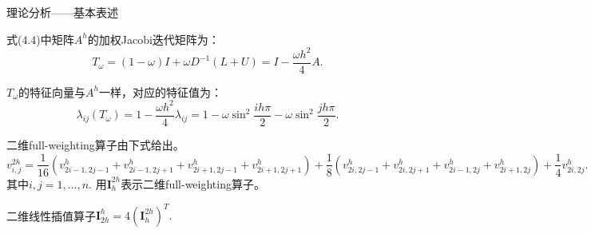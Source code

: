 \documentclass[9pt]{beamer}
\begin{document}
\begin{frame}{理论分析——基本表述}
  \small
\begin{lemma}
  \small
  式(4.4)中矩阵$A^h$的加权Jacobi迭代矩阵为：
  \begin{equation}
    T_\omega=(1-\omega)I+\omega D^{-1}(L+U)=I-\frac{\omega h^2}{4}A.
  \end{equation}

  $T_\omega$的特征向量与$A^h$一样，对应的特征值为：
  \begin{equation}
    \lambda_{ij}(T_\omega)=1-\frac{\omega h^2}{4}\lambda_{ij}=1-\omega\sin^2\frac{ih\pi}{2}-\omega\sin^2\frac{jh\pi}{2}.
  \end{equation}
\end{lemma}

\pause
\begin{definition}
  \small
  二维full-weighting算子由下式给出。
  {\tiny\hspace{-1em}
  \begin{equation*}
  v^{2h}_{i,j}=\frac{1}{16}(v^h_{2i-1,2j-1}+v^h_{2i-1,2j+1}+v^h_{2i+1,2j-1}+v^h_{2i+1,2j+1})
  +\frac{1}{8}(v^h_{2i,2j-1}+v^h_{2i,2j+1}+v^h_{2i-1,2j}+v^h_{2i+1,2j}) + \frac{1}{4}v^h_{2i,2j}.
  \end{equation*}
  }
  其中$i,j=1,...,n$. 用$\mathbf{I}_h^{2h}$表示二维full-weighting算子。
\end{definition}

\pause
\begin{definition}
  \small
  二维线性插值算子$\mathbf{I}_{2h}^h=4(\mathbf{I}_h^{2h})^T.$
\end{definition}
\end{frame}
\end{document}

